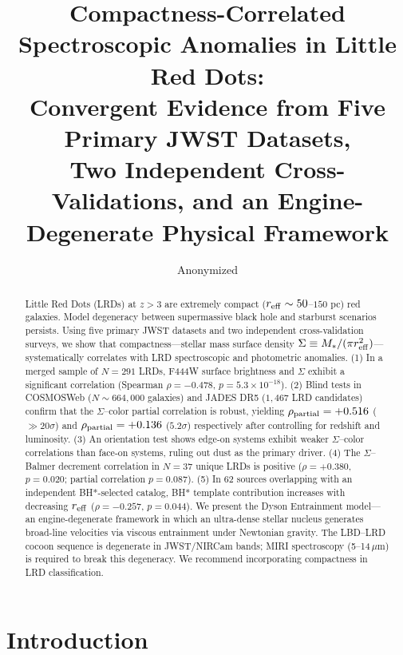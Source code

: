 \documentclass[twocolumn,linenumbers]{aastex631}
\begin{document}
\title{Compactness-Correlated Spectroscopic Anomalies in Little Red Dots:\\
Convergent Evidence from Five Primary JWST Datasets,\\
Two Independent Cross-Validations, and an Engine-Degenerate Physical Framework}

\author{Anonymized}

\begin{abstract}
Little Red Dots (LRDs) at $z > 3$ are extremely compact ($r_{\rm eff} \sim 50$--$150$ pc) red galaxies. Model degeneracy between supermassive black hole and starburst scenarios persists. Using five primary JWST datasets and two independent cross-validation surveys, we show that compactness---stellar mass surface density $\Sigma \equiv M_*/(\pi r_{\rm eff}^2)$---systematically correlates with LRD spectroscopic and photometric anomalies. (1) In a merged sample of $N=291$ LRDs, F444W surface brightness and $\Sigma$ exhibit a significant correlation (Spearman $\rho = -0.478$, $p = 5.3 \times 10^{-18}$). (2) Blind tests in COSMOSWeb ($N \sim 664,000$ galaxies) and JADES DR5 ($1,467$ LRD candidates) confirm that the $\Sigma$--color partial correlation is robust, yielding $\rho_{\rm partial} = +0.516$ (${\gg}20\sigma$) and $\rho_{\rm partial} = +0.136$ ($5.2\sigma$) respectively after controlling for redshift and luminosity. (3) An orientation test shows edge-on systems exhibit weaker $\Sigma$--color correlations than face-on systems, ruling out dust as the primary driver. (4) The $\Sigma$--Balmer decrement correlation in $N=37$ unique LRDs is positive ($\rho = +0.380$, $p = 0.020$; partial correlation $p=0.087$). (5) In 62 sources overlapping with an independent BH*-selected catalog, BH* template contribution increases with decreasing $r_{\rm eff}$ ($\rho = -0.257$, $p = 0.044$). We present the Dyson Entrainment model---an engine-degenerate framework in which an ultra-dense stellar nucleus generates broad-line velocities via viscous entrainment under Newtonian gravity. The LBD--LRD cocoon sequence is degenerate in JWST/NIRCam bands; MIRI spectroscopy (5--14\,$\mu$m) is required to break this degeneracy. We recommend incorporating compactness in LRD classification.
\end{abstract}


\section{Introduction} \label{sec:intro}
\end{document}
